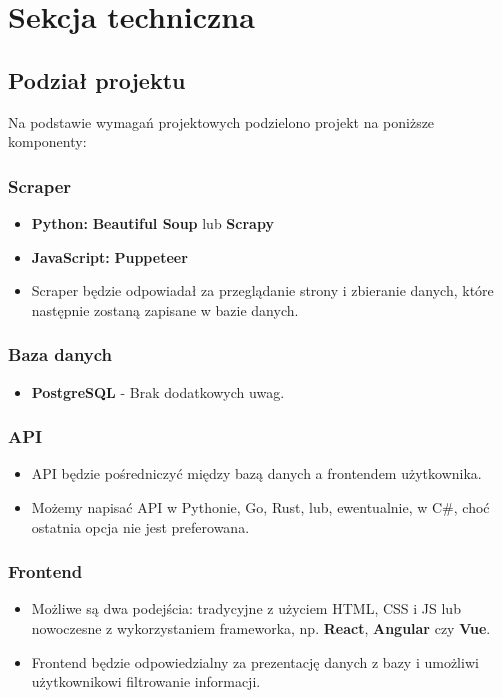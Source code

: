 \documentclass{article}
\begin{document}
\section{Sekcja techniczna}
\subsection{Podział projektu}
Na podstawie wymagań projektowych podzielono projekt na poniższe komponenty:

\subsubsection{Scraper}
\begin{itemize}
  \item \textbf{Python:} \textbf{Beautiful Soup} lub \textbf{Scrapy}
  \item \textbf{JavaScript:} \textbf{Puppeteer}
  \item Scraper będzie odpowiadał za przeglądanie strony i zbieranie danych, które następnie zostaną zapisane w bazie danych.
\end{itemize}

\subsubsection{Baza danych}
\begin{itemize}
  \item \textbf{PostgreSQL} - Brak dodatkowych uwag.
\end{itemize}

\subsubsection{API}
\begin{itemize}
  \item API będzie pośredniczyć między bazą danych a frontendem użytkownika.
  \item Możemy napisać API w Pythonie, Go, Rust, lub, ewentualnie, w C\#, choć ostatnia opcja nie jest preferowana.
\end{itemize}

\subsubsection{Frontend}
\begin{itemize}
  \item Możliwe są dwa podejścia: tradycyjne z użyciem HTML, CSS i JS lub nowoczesne z wykorzystaniem frameworka, np. \textbf{React}, \textbf{Angular} czy \textbf{Vue}.
  \item Frontend będzie odpowiedzialny za prezentację danych z bazy i umożliwi użytkownikowi filtrowanie informacji.
\end{itemize}
\end{document}
